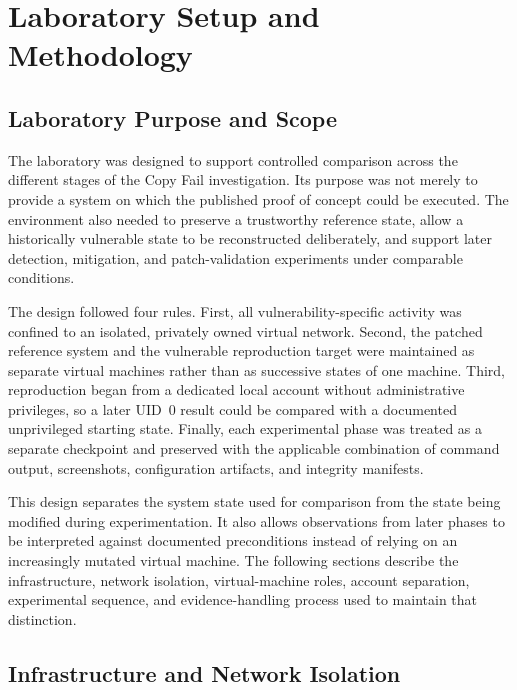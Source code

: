 \section{Laboratory Setup and Methodology}
\label{sec:lab-setup}

\graphicspath{{../evidence/}{evidence/}}

\subsection{Laboratory Purpose and Scope}

The laboratory was designed to support controlled comparison across the
different stages of the Copy Fail investigation. Its purpose was not merely to
provide a system on which the published proof of concept could be executed.
The environment also needed to preserve a trustworthy reference state, allow a
historically vulnerable state to be reconstructed deliberately, and support
later detection, mitigation, and patch-validation experiments under comparable
conditions.

The design followed four rules. First, all vulnerability-specific activity was
confined to an isolated, privately owned virtual network. Second, the patched
reference system and the vulnerable reproduction target were maintained as
separate virtual machines rather than as successive states of one machine.
Third, reproduction began from a dedicated local account without administrative
privileges, so a later UID~0 result could be compared with a documented
unprivileged starting state. Finally, each experimental phase was treated as a
separate checkpoint and preserved with the applicable combination of command
output, screenshots, configuration artifacts, and integrity manifests.

This design separates the system state used for comparison from the state
being modified during experimentation. It also allows observations from later
phases to be interpreted against documented preconditions instead of relying
on an increasingly mutated virtual machine. The following sections describe
the infrastructure, network isolation, virtual-machine roles, account
separation, experimental sequence, and evidence-handling process used to
maintain that distinction.

\subsection{Infrastructure and Network Isolation}


